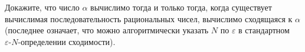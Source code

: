 Докажите, что число $\alpha$ вычислимо тогда и только тогда, когда существует вычислимая
последовательность рациональных чисел, вычислимо сходящаяся к $\alpha$ (последнее означает, что можно
алгоритмически указать $N$ по $\varepsilon$ в стандартном $\varepsilon\text{-}N$-определении сходимости).
